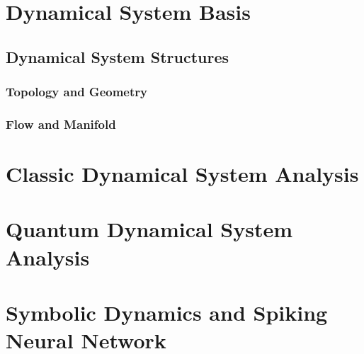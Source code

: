 
\chapter{Dynamical System Basis}
\section{Dynamical System Structures}
\subsection{Topology and Geometry}

\subsection{Flow and Manifold}

\chapter{Classic Dynamical System Analysis}

\chapter{Quantum Dynamical System Analysis}

\chapter{Symbolic Dynamics and Spiking Neural Network}

